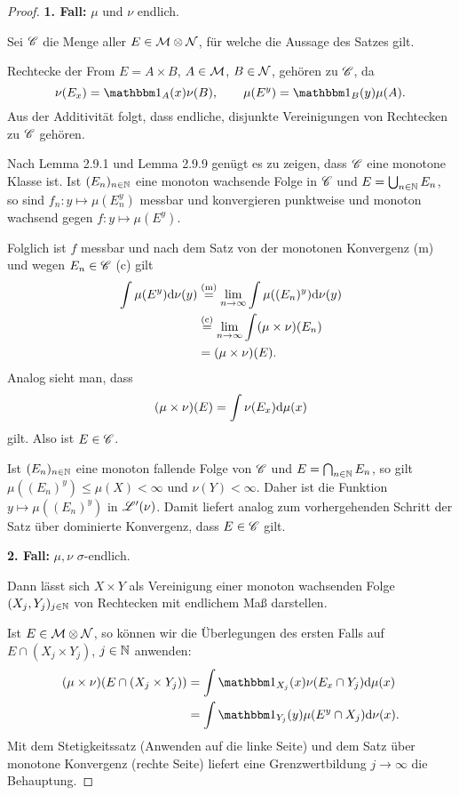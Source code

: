 \documentclass[
 a4paper,
 12pt,
 parskip=half
 ]{scrreprt}
\theoremstyle{plain}
\theoremstyle{definition}
\numberwithin{equation}{section}
\begin{document}
\begin{proof}
 \textbf{1. Fall:} $\mu$ und $\nu$ endlich. 
 
 Sei $\mathscr{C}$ die Menge aller $E \in \mathcal{M} \otimes \mathcal{N}$, für welche die Aussage des Satzes gilt.
 
 Rechtecke der From $E= A \times B$, $A \in \mathcal{M}$, $B \in \mathcal{N}$, gehören zu $\mathscr{C}$, da
 \[ \nu(E_x) = \ind_A (x) \nu(B), \qquad \mu(E^y) = \ind_B (y) \mu(A). \]
 Aus der Additivität folgt, dass endliche, disjunkte Vereinigungen von Rechtecken zu $\mathscr{C}$ gehören.
 
 Nach Lemma 2.9.1 und Lemma 2.9.9 genügt es zu zeigen, dass $\mathscr{C}$ eine monotone Klasse ist. Ist $(E_n)_{n \in \mathbb{N}}$ eine monoton wachsende Folge in $\mathscr{C}$ und $E = \bigcup_{n \in \mathbb{N}} E_n$, so sind $f_n: y \mapsto \mu(E_n^y)$ messbar und konvergieren punktweise und monoton wachsend gegen $f: y \mapsto \mu(E^y)$.
 
 Folglich ist $f$ messbar und nach dem Satz von der monotonen Konvergenz (m) und wegen $E_n \in \mathscr{C}$ (c) gilt
 \[ \begin{aligned}
     \int \mu(E^y) \mathrm{d} \nu(y) 
     &\overset{(\text{m})}{=} \lim_{n \to \infty} \int \mu((E_n)^y) \mathrm{d} \nu(y) \\
     &\overset{(\text{c})}{=} \lim_{n \to \infty} \int (\mu \times \nu)(E_n) \\
     &= (\mu \times \nu)(E).
    \end{aligned} \]
 Analog sieht man, dass
 \[ (\mu \times \nu)(E) = \int \nu(E_x) \mathrm{d} \mu(x) \]
 gilt. Also ist $E \in \mathscr{C}$.
 
 Ist $(E_n)_{n \in \mathbb{N}}$ eine monoton fallende Folge von $\mathscr{C}$ und $E = \bigcap_{n \in \mathbb{N}} E_n$, so gilt $\mu((E_n)^y) \le \mu(X) < \infty$ und $\nu(Y) < \infty$. Daher ist die Funktion $y \mapsto \mu((E_n)^y)$ in $\mathscr{L}'(\nu)$. Damit liefert analog zum vorhergehenden Schritt der Satz über dominierte Konvergenz, dass $E \in  \mathscr{C}$ gilt.
 
 \textbf{2. Fall:} $\mu, \nu$ $\sigma$-endlich.
 
 Dann lässt sich $X \times Y$ als Vereinigung einer monoton wachsenden Folge $(X_j,Y_j)_{j \in \mathbb{N}}$ von Rechtecken mit endlichem Maß darstellen.
 
 Ist $E \in \mathcal{M} \otimes \mathcal{N}$, so können wir die Überlegungen des ersten Falls auf $E \cap (X_j \times Y_j)$, $j \in \mathbb{N}$ anwenden:
 \[ \begin{aligned}
     (\mu \times \nu)(E \cap (X_j \times Y_j)) 
     &= \int \ind_{X_j}(x) \nu( E_x \cap Y_j ) \diffop \mu(x) \\
     &= \int \ind_{Y_j}(y) \mu( E^y \cap X_j ) \diffop \nu(x).
    \end{aligned} \]
 Mit dem Stetigkeitssatz (Anwenden auf die linke Seite) und dem Satz über monotone Konvergenz (rechte Seite) liefert eine Grenzwertbildung $j \to \infty$ die Behauptung.
\end{proof}
\end{document}
